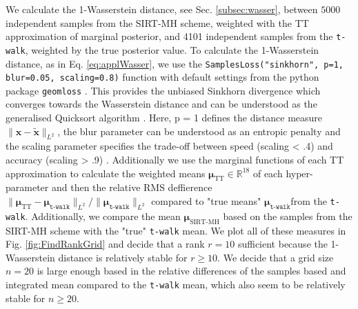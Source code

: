 We calculate the 1-Wasserstein distance, see Sec. \ref{subsec:wasser}, between $5000$ independent samples from the SIRT-MH scheme, weighted with the TT approximation of marginal posterior, and 4101 independent samples from the \texttt{t-walk}, weighted by the true posterior value.  
To calculate the 1-Wasserstein distance, as in Eq. \ref{eq:applWasser}, we use the \texttt{SamplesLoss("sinkhorn", p=1, blur=0.05, scaling=0.8)} function with default settings from the python package \texttt{geomloss} \cite{Wassersteinaccess}.
This provides the unbiased Sinkhorn divergence which converges towards the Wasserstein distance and can be understood as the generalised Quicksort algorithm \cite{feydy2020OT}.
Here, p = 1 defines the distance measure $\lVert \bm{x} -\tilde{\bm{x}} \rVert_{L^2}$, the blur parameter can be understood as an entropic penalty and the  scaling parameter specifies the trade-off between speed (scaling < .4) and accuracy (scaling > .9) \cite{Wassersteinaccess}.
Additionally we use the marginal functions of each TT approximation to calculate the weighted means $\bm{\mu}_{\text{TT}} \in \mathbb{R}^{18}$ of each hyper-parameter and then the relative RMS deffierence $\lVert\bm{\mu}_{\text{TT}} - \bm{\mu}_{\texttt{t-walk}} \rVert_{L^2} / \lVert \bm{\mu}_{\texttt{t-walk}} \rVert_{L^2}  $ compared to "true means"  $\bm{\mu}_{\texttt{t-walk}}$from the \texttt{t-walk}.
Additionally, we compare the mean $\bm{\mu}_{\text{SIRT-MH}}$ based on the samples from the SIRT-MH scheme with the "true" \texttt{t-walk} mean.
We plot all of these measures in Fig. \ref{fig:FindRankGrid} and decide that a rank $r = 10$ sufficient because the 1-Wasserstein distance is relatively stable for $r\geq10$.
We decide that a grid size $n = 20$ is large enough based in the relative differences of the samples based and integrated mean compared to the \texttt{t-walk} mean, which also seem to be relatively stable for $n \geq 20$.

